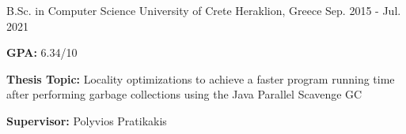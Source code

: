 
\begin{cventries}

  \cventry
    {B.Sc. in Computer Science} %
    {University of Crete} %
    {Heraklion, Greece} %
    {Sep. 2015 - Jul. 2021} %
    {
      \begin{cvitems} %
      \item{\textbf{GPA:} 6.34/10}
      \item{\textbf{Thesis Topic:} Locality optimizations to achieve a faster program running time after performing garbage collections using the Java Parallel Scavenge GC}
        \item{\textbf{Supervisor:} Polyvios Pratikakis}
      \end{cvitems}
    }

\end{cventries}
